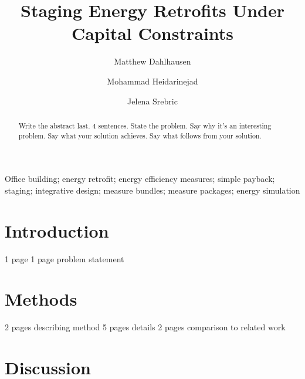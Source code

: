 \documentclass[review]{elsarticle}
\begin{document}
\begin{frontmatter}

\title{Staging Energy Retrofits Under Capital Constraints}

\author{Matthew Dahlhausen}
\author{Mohammad Heidarinejad}
\author{Jelena Srebric}
\address{University of Maryland}




\begin{abstract}
Write the abstract last.  4 sentences.  State the problem. Say why it's an interesting problem.  Say what your solution achieves.  Say what follows from your solution.  
\end{abstract}

\begin{keyword}
Office building; energy retrofit; energy efficiency measures; simple payback; staging; integrative design; measure bundles; measure packages; energy simulation 
\end{keyword}

\end{frontmatter}

\linenumbers

\section{Introduction}
1 page
1 page problem statement

\section{Methods}
2 pages describing method
5 pages details
2 pages comparison to related work

\section{Discussion}
\end{document}
